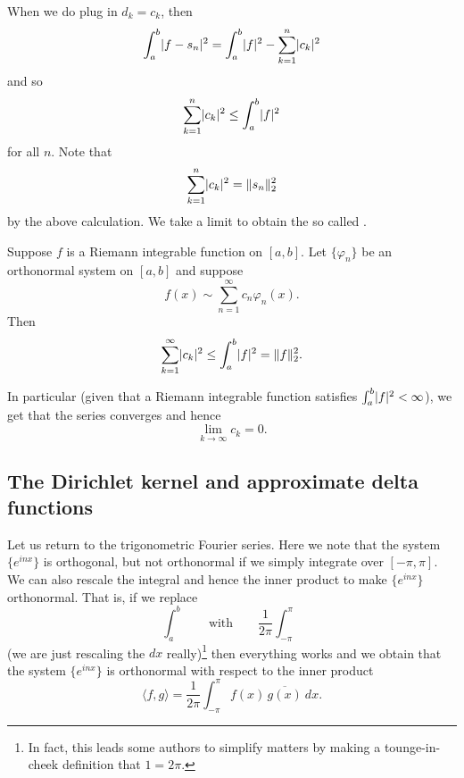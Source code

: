 When we do plug in $d_k = c_k$, then
\begin{equation*}
\int_a^b \lvert {f-s_n} \rvert^2
=
\int_a^b \lvert {f} \rvert^2
-
\sum_{k=1}^n \lvert {c_k} \rvert^2
\end{equation*}
and so
\begin{equation*}
\sum_{k=1}^n \lvert {c_k} \rvert^2
\leq
\int_a^b \lvert {f} \rvert^2
\end{equation*}
for all $n$.  Note that
\begin{equation*}
\sum_{k=1}^n \lvert {c_k} \rvert^2 = \lVert {s_n} \rVert_2^2
\end{equation*}
by the above calculation.
We take a limit to obtain the so called
\emph{}.

\begin{thm} \label{thm:bessels}
Suppose $f$ is a Riemann integrable function on $[a,b]$.
Let $\{ \varphi_n \}$ be an orthonormal system on $[a,b]$ and
suppose
\begin{equation*}
f(x) \sim \sum_{n=1}^\infty c_n \varphi_n(x) .
\end{equation*}
Then
\begin{equation*}
\sum_{k=1}^\infty \lvert {c_k} \rvert^2
\leq
\int_a^b \lvert {f} \rvert^2
= \lVert {f} \rVert_2^2 .
\end{equation*}
\end{thm}

In particular (given that a Riemann integrable function satisfies
$\int_a^b \lvert {f} \rvert^2 < \infty$), we get that the series
converges and hence
\begin{equation*}
\lim_{k \to \infty} c_k = 0 .
\end{equation*}

\subsection{The Dirichlet kernel and approximate delta functions}

Let us return to the trigonometric Fourier series.  Here we note that the
system $\{ e^{inx} \}$ is orthogonal, but not orthonormal if we simply
integrate over $[-\pi,\pi]$.  We can also rescale the integral
and hence the inner product to make 
$\{ e^{inx} \}$ orthonormal.  That is, if we replace
\begin{equation*}
\int_a^b \qquad \text{with} \qquad
\frac{1}{2\pi} \int_{-\pi}^\pi
\end{equation*}
(we are just rescaling the $dx$ really)\footnote{%
In fact, this leads some authors to simplify matters by
making a tounge-in-cheek definition that $1=2\pi$.}
then everything works and we obtain that the system $\{ e^{inx} \}$
is orthonormal with respect to the inner product
\begin{equation*}
\langle f , g \rangle =
\frac{1}{2\pi} \int_{-\pi}^\pi f(x) \, \overline{g(x)} ~ dx .
\end{equation*}

